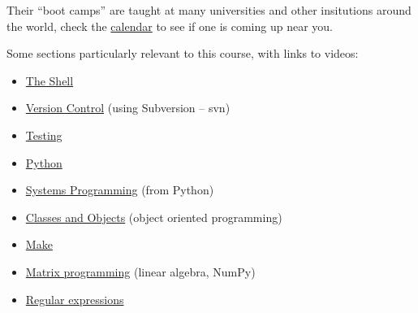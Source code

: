 \documentclass[letterpaper,10pt,english]{sphinxmanual}
\begin{document}
Their ``boot camps'' are taught at many universities and other insitutions
around the world, check the \href{http://software-carpentry.org/bootcamps/index.html\#calendar}{calendar} to see if
one is coming up near you.

Some sections particularly relevant to this course, with links to videos:
\begin{itemize}
\item {} 
\href{http://software-carpentry.org/4\_0/shell/}{The Shell}

\item {} 
\href{http://software-carpentry.org/4\_0/vc/}{Version Control}
(using Subversion -- svn)

\item {} 
\href{http://software-carpentry.org/4\_0/test/}{Testing}

\item {} 
\href{http://software-carpentry.org/4\_0/python/}{Python}

\item {} 
\href{http://software-carpentry.org/4\_0/sysprog/}{Systems Programming}
(from Python)

\item {} 
\href{http://software-carpentry.org/4\_0/oop/}{Classes and Objects}
(object oriented programming)

\item {} 
\href{http://software-carpentry.org/4\_0/make/}{Make}

\item {} 
\href{http://software-carpentry.org/4\_0/matrix/}{Matrix programming} (linear
algebra, NumPy)

\item {} 
\href{http://software-carpentry.org/4\_0/regexp/}{Regular expressions}

\end{itemize}
\end{document}
